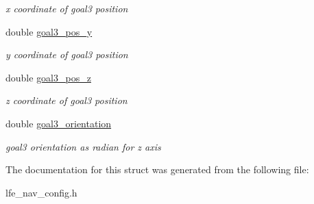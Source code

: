 \begin{DoxyCompactItemize}
\begin{DoxyCompactList}\small\item\em x coordinate of goal3 position \end{DoxyCompactList}\item 
double \hyperlink{structlfe__navigation_1_1LfeNavConfig_1_1Navigation_a37e831281f17149b912a9e544c8f47b2}{goal3\+\_\+pos\+\_\+y}\hypertarget{structlfe__navigation_1_1LfeNavConfig_1_1Navigation_a37e831281f17149b912a9e544c8f47b2}{}\label{structlfe__navigation_1_1LfeNavConfig_1_1Navigation_a37e831281f17149b912a9e544c8f47b2}

\begin{DoxyCompactList}\small\item\em y coordinate of goal3 position \end{DoxyCompactList}\item 
double \hyperlink{structlfe__navigation_1_1LfeNavConfig_1_1Navigation_a11c2e0e0dcf592311ad115c85cffb33d}{goal3\+\_\+pos\+\_\+z}\hypertarget{structlfe__navigation_1_1LfeNavConfig_1_1Navigation_a11c2e0e0dcf592311ad115c85cffb33d}{}\label{structlfe__navigation_1_1LfeNavConfig_1_1Navigation_a11c2e0e0dcf592311ad115c85cffb33d}

\begin{DoxyCompactList}\small\item\em z coordinate of goal3 position \end{DoxyCompactList}\item 
double \hyperlink{structlfe__navigation_1_1LfeNavConfig_1_1Navigation_a983e0a1daa2aceae55047d3b67691475}{goal3\+\_\+orientation}\hypertarget{structlfe__navigation_1_1LfeNavConfig_1_1Navigation_a983e0a1daa2aceae55047d3b67691475}{}\label{structlfe__navigation_1_1LfeNavConfig_1_1Navigation_a983e0a1daa2aceae55047d3b67691475}

\begin{DoxyCompactList}\small\item\em goal3 orientation as radian for z axis \end{DoxyCompactList}\end{DoxyCompactItemize}


The documentation for this struct was generated from the following file\+:\begin{DoxyCompactItemize}
\item 
lfe\+\_\+nav\+\_\+config.\+h\end{DoxyCompactItemize}
